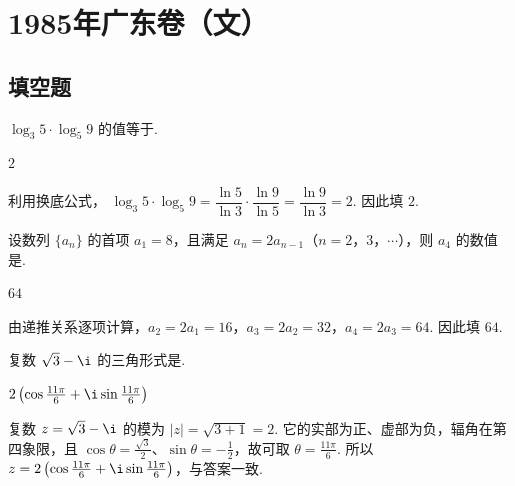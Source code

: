 \chapter{1985年广东卷（文）}

\section{填空题}

\begin{problem}

\(\log_{3}5\cdot\log_{5}9 \) 的值等于\fillinblank{}.
\begin{answer}
\(2\)
\end{answer}

\begin{solution}
利用换底公式，
\(\log_{3}5\cdot\log_{5}9=\dfrac{\ln5}{\ln3}\cdot\dfrac{\ln9}{\ln5}=\dfrac{\ln9}{\ln3}=2\). 因此填 \(2\).
\end{solution}
\end{problem}

\begin{problem}

设数列 \(\{a_{n}\}\) 的首项 \(a_{1} = 8\)，且满足 \(a_{n} = 2a_{n-1}\)（\(n = 2\)，\(3\)，\(\cdots\)），则 \(a_{4}\) 的数值是\fillinblank{}.
\begin{answer}
\(64\)
\end{answer}

\begin{solution}
由递推关系逐项计算，\(a_{2}=2a_{1}=16\)，\(a_{3}=2a_{2}=32\)，\(a_{4}=2a_{3}=64\). 因此填 \(64\).
\end{solution}
\end{problem}

\begin{problem}

复数 \(\sqrt{3}-\i \) 的三角形式是\fillinblank{}.
\begin{answer}
\(2\left(\cos\frac{11\pi}{6}+\i\sin\frac{11\pi}{6}\right)\)
\end{answer}

\begin{solution}
复数 \(z=\sqrt3-\i\) 的模为 \(|z|=\sqrt{3+1}=2\). 它的实部为正、虚部为负，辐角在第四象限，且 \(\cos\theta=\frac{\sqrt3}{2}\)、\(\sin\theta=-\frac12\)，故可取 \(\theta=\frac{11\pi}{6}\). 所以
\(z=2\left(\cos\frac{11\pi}{6}+\i\sin\frac{11\pi}{6}\right)\)，与答案一致.
\end{solution}
\end{problem}

